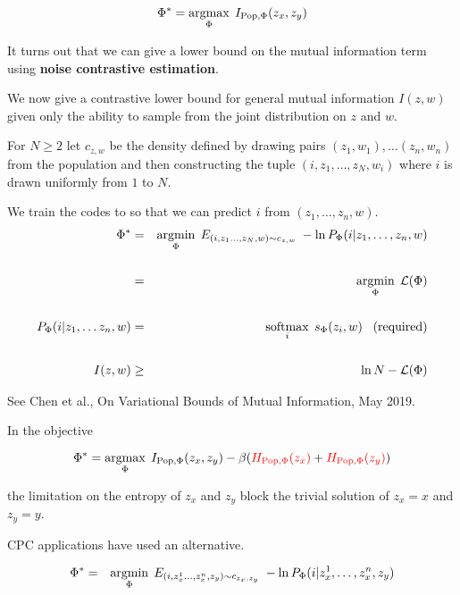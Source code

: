 {

$$\Phi^* = \operatorname*{argmax}_{\Phi} \; I_{\mathrm{Pop},\Phi}(z_x,z_y)$$

\vfill
It turns out that we can give a lower bound on the mutual information term using {\bf noise contrastive estimation}.


We now give a contrastive lower bound for general mutual information $I(z,w)$ given only the ability to sample from the joint distribution on $z$ and $w$.

\vfill
For $N \geq 2$ let {\color{red} $c_{z,w}$} be the density defined by drawing pairs $(z_1,w_1), \ldots (z_n,w_n)$ from the population
and then constructing the tuple $(i,z_1,\ldots,z_N,w_i)$ where $i$ is drawn uniformly from $1$ to $N$.

We train the codes to so that we can predict $i$ from $(z_1,\ldots,z_n,w)$.
{\huge
\begin{eqnarray*}
\Phi^* & = & \operatorname*{argmin}_\Phi \;E_{(i,z_1\ldots,z_N,w) \sim c_{z,w}}\;-\ln P_\Phi(i|z_1,\ldots,z_n,w) \\
\\
& = & \operatorname*{argmin}_\Phi\;{\cal L}(\Phi) \\
\\
P_\Phi(i|z_1,\ldots z_n,w) & = & \operatorname*{softmax}_i\;s_\Phi(z_i,w) \;\;\;\mbox{(required)} \\
\\
I(z,w) & \geq & \ln N - {\cal L}(\Phi)
\end{eqnarray*}
}

See Chen et al., On Variational Bounds of Mutual Information, May 2019.


In the objective

$$\Phi^* = \operatorname*{argmax}_{\Phi} \; I_{\mathrm{Pop},\Phi}(z_x,z_y) - \beta ({\color{red} H_{\mathrm{Pop},\Phi}(z_x)} + {\color{red} H_{\mathrm{Pop},\Phi}(z_y)})$$


the limitation on the entropy of $z_x$ and $z_y$ block the trivial solution of $z_x = x$ and $z_y = y$.


\vfill
CPC applications have used an alternative.


\begin{eqnarray*}
\Phi^* & = & \operatorname*{argmin}_\Phi \;E_{(i,z_x^1\ldots,z_x^n,z_y) \sim c_{z_x,z_y}}\;-\ln P_\Phi(i|z_x^1,\ldots,z_x^n,z_y)
\end{eqnarray*}

}
